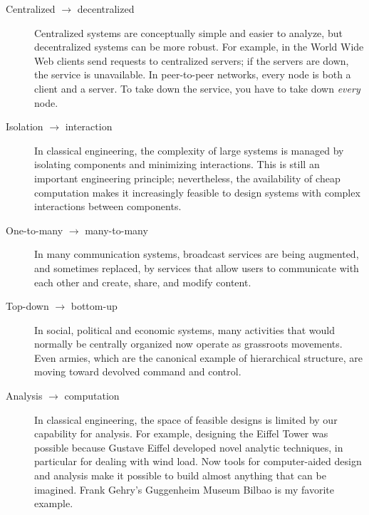 \documentclass[12pt]{book}
\theoremstyle{exercise}
\begin{document}
\begin{description}

\item[Centralized $\rightarrow$ decentralized] Centralized systems are
  conceptually simple and easier to analyze, but decentralized systems
  can be more robust.  For example, in the World Wide Web clients send
  requests to centralized servers; if the servers are down, the
  service is unavailable.  In peer-to-peer networks, every node is
  both a client and a server.  To take down the service, you have to
  take down {\em every} node.

  
\item[Isolation $\rightarrow$ interaction] In classical engineering,
  the complexity of large systems is managed by isolating components
  and minimizing interactions.  This is still an important engineering
  principle; nevertheless, the availability of cheap computation makes
  it increasingly feasible to design systems with complex interactions
  between components.


\item[One-to-many $\rightarrow$ many-to-many] In many communication
  systems, broadcast services are being augmented, and sometimes
  replaced, by services that allow users to communicate with each
  other and create, share, and modify content.  


\item[Top-down $\rightarrow$ bottom-up] In social, political and
  economic systems, many activities that would normally be centrally
  organized now operate as grassroots movements.  Even armies, which
  are the canonical example of hierarchical structure, are moving
  toward devolved command and control.


\item[Analysis $\rightarrow$ computation] In classical engineering,
  the space of feasible designs is limited by our capability for
  analysis.  For example, designing the Eiffel Tower was possible
  because Gustave Eiffel developed novel analytic techniques, in
  particular for dealing with wind load.  Now tools for computer-aided
  design and analysis make it possible to build almost anything that
  can be imagined.  Frank Gehry's Guggenheim Museum Bilbao is my
  favorite example.


\end{description}
\end{document}
